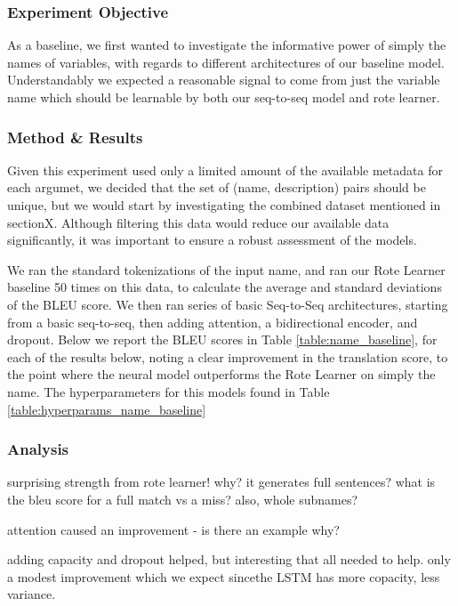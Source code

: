 \subsubsection{Experiment Objective} %

As a baseline, we first wanted to investigate the informative power of simply the names of variables, with regards to different architectures of our baseline model.
Understandably we expected a reasonable signal to come from just the variable name which should be learnable by both our seq-to-seq model and rote learner. 

\subsubsection{Method \& Results} %
Given this experiment used only a limited amount of the available metadata for each argumet, we decided that the set of (name, description) pairs should be unique, but we would start by investigating the combined dataset mentioned in sectionX.
Although filtering this data would reduce our available data significantly, it was important to ensure a robust assessment of the models.

We ran the standard tokenizations of the input name, and ran our Rote Learner baseline 50 times on this data, to calculate the average and standard deviations of the BLEU score. We then ran series of basic Seq-to-Seq architectures, starting from a basic seq-to-seq, then adding attention, a bidirectional encoder, and dropout. 
Below we report the BLEU scores in Table \ref{table:name_baseline}, for each of the results below, noting a clear improvement in the translation score, to the point where the neural model outperforms the Rote Learner on simply the name.
The hyperparameters for this models found in Table \ref{table:hyperparams_name_baseline}


\subsubsection{Analysis} %

\begin{itemize*}
    \item surprising strength from rote learner! why? it generates full sentences? what is the bleu score for a full match vs a miss? also, whole subnames?
    \item attention caused an improvement - is there an example why?
    \item adding capacity and dropout helped, but interesting that all needed to help. only a modest improvement which we expect sincethe LSTM has more copacity, less variance.
\end{itemize*}


